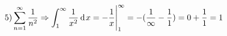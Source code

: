 $$
5) \sum_{n=1}^\infty \dfrac{1}{n^2}
\Rightarrow
    \int_{1}^\infty \dfrac{1}{x^2} \hspace{2pt}\text{d}\hspace{1pt}{x}
=  - \dfrac{1}{x} \Bigg|_{1}^\infty
=  - (\dfrac{1}{\infty} - \dfrac{1}{1})
=  0 + \dfrac{1}{1} = 1
$$


